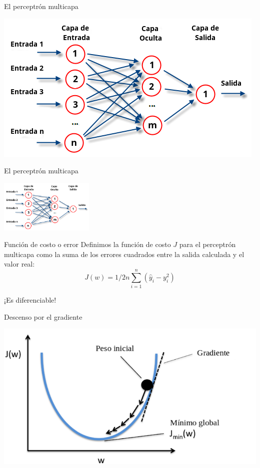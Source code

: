 \documentclass[presentation]{beamer}
\begin{document}
\begin{frame}[label={sec:orgeed2154}]{El perceptrón multicapa}
\begin{center}
\includegraphics[width=.9\linewidth]{images/mlp.png}
\end{center}
\end{frame}
\begin{frame}[label={sec:org3ca0e72}]{El perceptrón multicapa}
\begin{center}
\includegraphics[width=170px]{images/mlp.png}
\end{center}
\begin{block}{Función de costo o error}
Definimos la función de costo \alert{\(J\)} para el perceptrón multicapa
como la suma de los errores cuadrados entre la salida calculada y
el valor real:
\begin{equation*}
J(w)=1/2n \sum_{i=1}^n (\hat{y}_i - y_i^2)
\end{equation*}

\pause
\begin{center}
¡Es diferenciable!
\end{center}
\end{block}
\end{frame}
\begin{frame}[label={sec:org6f25143}]{Descenso por el gradiente}
\begin{center}
\includegraphics[width=.9\linewidth]{images/gradient-descent.png}
\end{center}
\end{frame}
\end{document}
